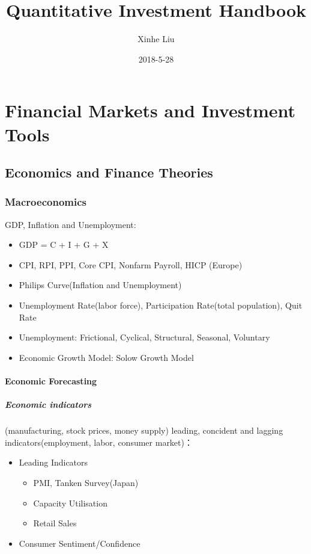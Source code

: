 \documentclass[11pt, openany]{book}              %
\title{\bf Quantitative Investment Handbook}    %
\author{Xinhe Liu}              %
\date{2018-5-28}                           %
\begin{document}
\maketitle                              %
\tableofcontents                        %
\mainmatter                             %

\part{Financial Markets and Investment Tools}

\chapter{Economics and Finance Theories}

\section{Macroeconomics} 

GDP, Inflation and Unemployment:

\begin{itemize}
    \item GDP = C + I + G + X 
    \item CPI, RPI, PPI, Core CPI, Nonfarm Payroll, HICP (Europe)
    \item Philips Curve(Inflation and Unemployment)
    \item Unemployment Rate(labor force), Participation Rate(total population), Quit Rate 
    \item Unemployment: Frictional, Cyclical, Structural, Seasonal, Voluntary 
    \item Economic Growth Model: Solow Growth Model
\end{itemize}

\subsection{Economic Forecasting}

\subsubsection{Economic indicators}

(manufacturing, stock prices, money supply) leading, concident and lagging indicators(employment, labor, consumer market)：
\begin{itemize}
	\item Leading Indicators \\
	\begin{itemize}
    	\item PMI, Tanken Survey(Japan)
    	\item Capacity Utilisation 
    	\item Retail Sales
	\end{itemize}
	 \item Consumer Sentiment/Confidence 
\end{itemize}
\end{document}

